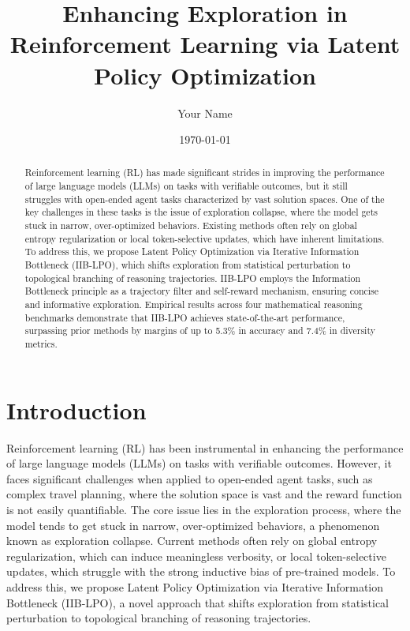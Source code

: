 \documentclass{article}
\title{Enhancing Exploration in Reinforcement Learning via Latent Policy Optimization}
\author{Your Name}
\date{\today}
\begin{document}
\maketitle

\begin{abstract}
Reinforcement learning (RL) has made significant strides in improving the performance of large language models (LLMs) on tasks with verifiable outcomes, but it still struggles with open-ended agent tasks characterized by vast solution spaces. One of the key challenges in these tasks is the issue of exploration collapse, where the model gets stuck in narrow, over-optimized behaviors. Existing methods often rely on global entropy regularization or local token-selective updates, which have inherent limitations. To address this, we propose Latent Policy Optimization via Iterative Information Bottleneck (IIB-LPO), which shifts exploration from statistical perturbation to topological branching of reasoning trajectories. IIB-LPO employs the Information Bottleneck principle as a trajectory filter and self-reward mechanism, ensuring concise and informative exploration. Empirical results across four mathematical reasoning benchmarks demonstrate that IIB-LPO achieves state-of-the-art performance, surpassing prior methods by margins of up to 5.3\% in accuracy and 7.4\% in diversity metrics.
\end{abstract}

\section{Introduction}
Reinforcement learning (RL) has been instrumental in enhancing the performance of large language models (LLMs) on tasks with verifiable outcomes. However, it faces significant challenges when applied to open-ended agent tasks, such as complex travel planning, where the solution space is vast and the reward function is not easily quantifiable. The core issue lies in the exploration process, where the model tends to get stuck in narrow, over-optimized behaviors, a phenomenon known as exploration collapse. Current methods often rely on global entropy regularization, which can induce meaningless verbosity, or local token-selective updates, which struggle with the strong inductive bias of pre-trained models. To address this, we propose Latent Policy Optimization via Iterative Information Bottleneck (IIB-LPO), a novel approach that shifts exploration from statistical perturbation to topological branching of reasoning trajectories. 
\end{document}
